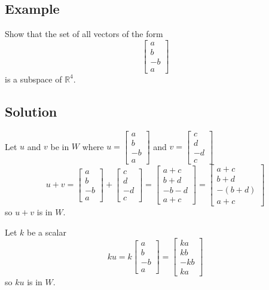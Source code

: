 \subsection*{Example}
Show that the set of all vectors of the form
\[\begin{bmatrix}
        a \\b\\-b\\a
    \end{bmatrix}\]
is a subspace of $\mathbb{R}^4$.

\subsection*{Solution}
Let $u$ and $v$ be in $W$ where $u=\begin{bmatrix}
        a \\b\\-b\\a
    \end{bmatrix}$ and $v=\begin{bmatrix}
        c \\d\\-d\\c
    \end{bmatrix}$
\[u+v=\begin{bmatrix}
        a \\b\\-b\\a
    \end{bmatrix}+\begin{bmatrix}
        c \\d\\-d\\c
    \end{bmatrix}=\begin{bmatrix}
        a+c \\b+d\\-b-d\\a+c
    \end{bmatrix}=\begin{bmatrix}
        a+c \\b+d\\-(b+d)\\a+c
    \end{bmatrix}\]
so $u+v$ is in $W$.

Let $k$ be a scalar
\[ku=k\begin{bmatrix}
        a \\b\\-b\\a
    \end{bmatrix}=\begin{bmatrix}
        ka \\kb\\-kb\\ka
    \end{bmatrix}\]
so $ku$ is in $W$.


